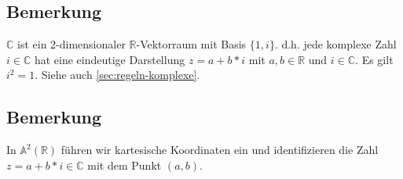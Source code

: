 
\subsection{Bemerkung}
$\mathbb{C}$ ist ein 2-dimensionaler $\mathbb{R}$-Vektorraum mit Basis $\{1,i\}$.
d.h. jede komplexe Zahl $i \in \mathbb{C}$ hat eine eindeutige Darstellung $z = a + b * i$ mit  $a,b \in \mathbb{R}$ und $i \in \mathbb{C}$.
Es gilt $i^2 = 1$. Siehe auch \ref{sec:regeln-komplexe}.


\subsection{Bemerkung}
In $\mathbb{A}^2(\mathbb{R})$ führen wir kartesische Koordinaten ein und identifizieren die Zahl $z = a+b*i \in \mathbb{C}$ mit dem Punkt $(a,b)$.

